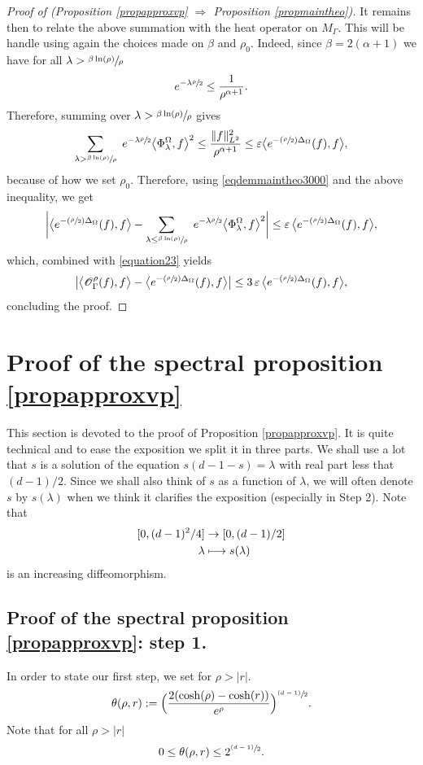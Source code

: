 \documentclass[10pt]{amsart}
\let\mathcal\mathscr
\let\epsilon\varepsilon
\newcommand{\Psfrac}[2]{(\sfrac{#1}{#2})}
\newcommand{\psfrac}[2]{\sfrac{(#1)}{#2}}
\def\mto{\mathchoice{\longmapsto}{\mapsto}{\mapsto}{\mapsto}}
\theoremstyle{plain}
\theoremstyle{definition}
\newcommand{\somme}[1]{\sum_{#1}}
\newcommand{\fonctionbis}[4]{\begin{split}
#1 & \to #2 \\
#3 & \mto #4
\end{split}}
\begin{document}
\begin{proof}[Proof of (Proposition \ref{propapproxvp}
$\Rightarrow$ Proposition \ref{propmaintheo})]
It remains then to relate the above summation with the heat operator on $M_\Gamma$. This will be handle using again the choices made on $\beta$ and $\rho_0$. Indeed, since $\beta = 2(\alpha +1)$ we have for all $\lambda > \sfrac{\beta \ln (\rho)}{\rho}$
\[
e^{-\lambda \sfrac{\rho}{2}} \le \frac{1}{\rho^{\alpha +1}}.
\]
Therefore, summing over $\lambda > \sfrac{\beta \ln (\rho)} {\rho}$ gives
\[
\somme{ \lambda > \sfrac{\beta \ln (\rho)} {\rho}} \ e^{-\lambda \sfrac{\rho}{2}} \bigl<\Phi^{\Omega}_{\lambda},f \bigr>^2 \le \frac{\|f\|_{L^2}^2}{\rho^{\alpha+1}} \le \epsilon \bigl< e^{- \Psfrac{\rho}{2} \Delta_{\Omega}}(f), f \bigr>,
\]
because of how we set $\rho_0$. Therefore, using \eqref{eqdemmaintheo3000} and the above inequality, we get
\[
\biggl| \bigl< e^{- \Psfrac{\rho}{2} \Delta_{\Omega}}(f), f \bigr> - \somme{ \lambda \le \sfrac{\beta \ln (\rho)} {\rho}} \ e^{-\lambda \sfrac{\rho}{2}} \bigl<\Phi^{\Omega}_{\lambda},f \bigr>^2 \biggr| \le \epsilon \,\bigl< e^{- \Psfrac{\rho}{2} \Delta_{\Omega}}(f), f \bigr>,
\]
which, combined with \eqref{equation23} yields
\[
\bigl| \bigl< \mathcal{O}_{\Gamma}^{\rho}(f),f \bigr> - \bigl< e^{- \Psfrac{\rho}{2} \Delta_{\Omega}}(f), f \bigr> \bigr| \le 3 \, \epsilon \, \bigl< e^{- \Psfrac{\rho}{2} \Delta_{\Omega}}(f), f \bigr>,
\]
concluding the proof.
\end{proof}

\section{Proof of the spectral proposition \ref{propapproxvp}}
\label{secetudevpselberg}

This section is devoted to the proof of Proposition \ref{propapproxvp}. It is quite technical and to ease the exposition we split it in three parts. We shall use a lot that $s$ is a solution of the equation $s(d-1-s) = \lambda$ with real part less that $(d-1)/2$. Since we shall also think of $s$ as a function of $\lambda$, we will often denote $s$ by $s(\lambda)$ when we think it clarifies the exposition (especially in Step 2). Note that
\[
\fonctionbis{[0, (d-1)^2/4 ]}{[0, (d -1)/2]}{\lambda}{s(\lambda)}
\]
is an increasing diffeomorphism.

\subsection{Proof of the spectral proposition \ref{propapproxvp}: step 1.} In order to state our first step, we set for $\rho > |r|$.
\[
\theta(\rho,r) := \Bigl(\frac{2(\cosh(\rho) - \cosh(r))}{e^{\rho}} \Bigr)^{\psfrac{d-1}{2}}.
\]
Note that for all $\rho > |r|$
\[
0 \le \theta(\rho,r) \le 2^{\psfrac{d-1}{2}}.
\]
\end{document}

